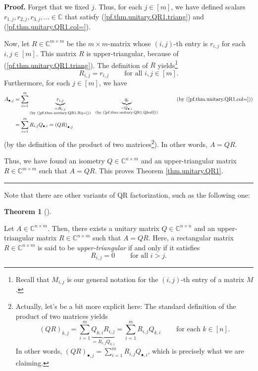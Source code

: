 \documentclass[numbers=enddot,12pt,final,onecolumn,notitlepage]{scrartcl}%
\numberwithin{exer}{subsection}
\theoremstyle{definition}
\newtheorem{theo}{Theorem}[subsection]
\newenvironment{theorem}[1][]
{\begin{theo}[#1]\begin{leftbar}}
{\end{leftbar}\end{theo}}
\newenvironment{proof}[1][Proof]{\noindent\textbf{#1.} }{\ \rule{0.5em}{0.5em}}
\let\sumnonlimits\sum
\renewcommand{\sum}{\sumnonlimits\limits}
\begin{document}
\begin{proof}
Forget that we fixed $j$. Thus, for each $j\in\left[  m\right]  $, we have
defined scalars $r_{1,j},r_{2,j},r_{3,j},\ldots\in\mathbb{C}$ that satisfy
(\ref{pf.thm.unitary.QR1.triang}) and (\ref{pf.thm.unitary.QR1.col=}).

Now, let $R\in\mathbb{C}^{m\times m}$ be the $m\times m$-matrix whose $\left(
i,j\right)  $-th entry is $r_{i,j}$ for each $i,j\in\left[  m\right]  $. This
matrix $R$ is upper-triangular, because of (\ref{pf.thm.unitary.QR1.triang}).
The definition of $R$ yields\footnote{Recall that $M_{i,j}$ is our general
notation for the $\left(  i,j\right)  $-th entry of a matrix $M$.}%
\begin{equation}
R_{i,j}=r_{i,j}\ \ \ \ \ \ \ \ \ \ \text{for all }i,j\in\left[  m\right]  .
\label{pf.thm.unitary.QR1.Rij=}%
\end{equation}
Furthermore, for each $j\in\left[  m\right]  $, we have%
\begin{align*}
A_{\bullet,j}  &  =\sum_{i=1}^{m}\underbrace{r_{i,j}}_{\substack{=R_{i,j}%
\\\text{(by (\ref{pf.thm.unitary.QR1.Rij=}))}}}\ \ \underbrace{q_{i}%
}_{\substack{=Q_{\bullet,i}\\\text{(by (\ref{pf.thm.unitary.QR1.Qbull}))}%
}}\ \ \ \ \ \ \ \ \ \ \left(  \text{by (\ref{pf.thm.unitary.QR1.col=})}\right)
\\
&  =\sum_{i=1}^{m}R_{i,j}Q_{\bullet,i}=\left(  QR\right)  _{\bullet,j}%
\end{align*}
(by the definition of the product of two matrices\footnote{Actually, let's be
a bit more explicit here: The standard definition of the product of two
matrices yields%
\[
\left(  QR\right)  _{k,j}=\sum_{i=1}^{m}\underbrace{Q_{k,i}R_{i,j}}%
_{=R_{i,j}Q_{k,i}}=\sum_{i=1}^{m}R_{i,j}Q_{k,i}\ \ \ \ \ \ \ \ \ \ \text{for
each }k\in\left[  n\right]  .
\]
In other words, $\left(  QR\right)  _{\bullet,j}=\sum_{i=1}^{m}R_{i,j}%
Q_{\bullet,i}$, which is precisely what we are claiming.}). In other words,
$A=QR$.

Thus, we have found an isometry $Q\in\mathbb{C}^{n\times m}$ and an
upper-triangular matrix $R\in\mathbb{C}^{m\times m}$ such that $A=QR$. This
proves Theorem \ref{thm.unitary.QR1}.
\end{proof}

Note that there are other variants of QR factorization, such as the following one:

\begin{theorem}
[QR factorization, unitary version]\label{thm.unitary.QR2}Let $A\in
\mathbb{C}^{n\times m}$. Then, there exists a unitary matrix $Q\in
\mathbb{C}^{n\times n}$ and an upper-triangular matrix $R\in\mathbb{C}%
^{n\times m}$ such that $A=QR$. Here, a rectangular matrix $R\in
\mathbb{C}^{n\times m}$ is said to be \emph{upper-triangular} if and only if
it satisfies%
\[
R_{i,j}=0\ \ \ \ \ \ \ \ \ \ \text{for all }i>j.
\]

\end{theorem}
\end{document}

